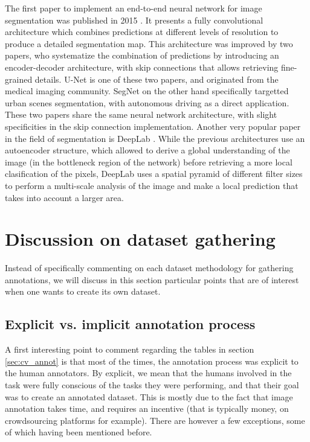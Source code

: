 The first paper to implement an end-to-end neural network for image segmentation was published in 2015 \cite{long2015fully}. It presents a fully convolutional architecture which combines predictions at different levels of resolution to produce a detailed segmentation map. This architecture was improved by two papers, who systematize the combination of predictions by introducing an encoder-decoder architecture, with skip connections that allows retrieving fine-grained details. U-Net \cite{ronneberger2015u} is one of these two papers, and originated from the medical imaging community. SegNet \cite{badrinarayanan2017segnet} on the other hand specifically targetted urban scenes segmentation, with autonomous driving as a direct application. These two papers share the same neural network architecture, with slight specificities in the skip connection implementation. Another very popular paper in the field of segmentation is DeepLab \cite{chen2017deeplab}. While the previous architectures use an autoencoder structure, which allowed to derive a global understanding of the image (in the bottleneck region of the network) before retrieving a more local clasification of the pixels, DeepLab uses a spatial pyramid of different filter sizes to perform a multi-scale analysis of the image and make a local prediction that takes into account a larger area.

\section{Discussion on dataset gathering}

Instead of specifically commenting on each dataset methodology for gathering annotations, we will discuss in this section particular points that are of interest when one wants to create its own dataset. 

\subsection{Explicit vs. implicit annotation process}
A first interesting point to comment regarding the tables in section \ref{sec:cv_annot} is that most of the times, the annotation process was explicit to the human annotators. By explicit, we mean that the humans involved in the task were fully conscious of the tasks they were performing, and that their goal was to create an annotated dataset. This is mostly due to the fact that image annotation takes time, and requires an incentive (that is typically money, on crowdsourcing platforms for example). There are however a few exceptions, some of which having been mentioned before. 


